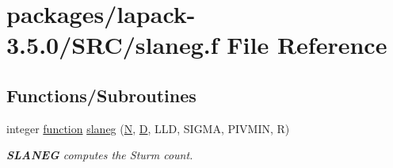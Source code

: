 \hypertarget{slaneg_8f}{}\section{packages/lapack-\/3.5.0/\+S\+R\+C/slaneg.f File Reference}
\label{slaneg_8f}
\subsection*{Functions/\+Subroutines}
\begin{DoxyCompactItemize}
\item 
integer \hyperlink{afunc_8m_a7b5e596df91eadea6c537c0825e894a7}{function} \hyperlink{group__auxOTHERauxiliary_ga7ea5fb550bbab683a539b551e3496bcc}{slaneg} (\hyperlink{polmisc_8c_a0240ac851181b84ac374872dc5434ee4}{N}, \hyperlink{odrpack_8h_a7dae6ea403d00f3687f24a874e67d139}{D}, L\+L\+D, S\+I\+G\+M\+A, P\+I\+V\+M\+I\+N, R)
\begin{DoxyCompactList}\small\item\em {\bfseries S\+L\+A\+N\+E\+G} computes the Sturm count. \end{DoxyCompactList}\end{DoxyCompactItemize}
